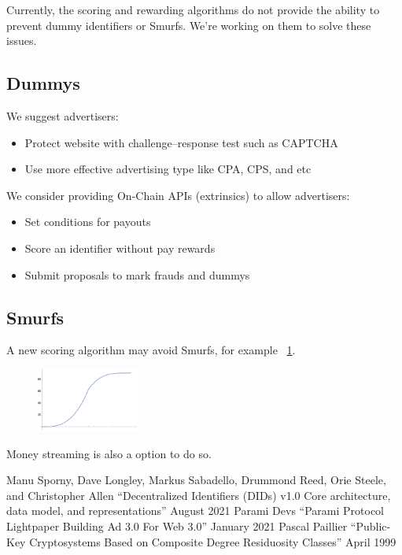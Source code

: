 \documentclass[twoside,twocolumn]{article}
\begin{document}
Currently, the scoring and rewarding algorithms do not provide the ability to prevent dummy identifiers or Smurfs.
We're working on them to solve these issues.

\subsection{Dummys}

We suggest advertisers:
\begin{itemize}
    \item Protect website with challenge–response test such as CAPTCHA
    \item Use more effective advertising type like CPA, CPS, and etc
\end{itemize}

We consider providing On-Chain APIs (extrinsics) to allow advertisers:
\begin{itemize}
    \item Set conditions for payouts
    \item Score an identifier without pay rewards
    \item Submit proposals to mark frauds and dummys
\end{itemize}

\subsection{Smurfs}

A new scoring algorithm may avoid Smurfs, for example ~\ref{fig:score_d}.

\begin{figure}
    \centering
    \includegraphics[width=0.3\textwidth]{score_d}
    \label{fig:score_d}
\end{figure}

Money streaming is also a option to do so.


\begin{thebibliography}{99} %

     Manu Sporny, Dave Longley, Markus Sabadello, Drummond Reed,
    Orie Steele, and Christopher Allen
    ``Decentralized Identifiers (DIDs) v1.0 Core architecture, data model, and representations''
    August 2021
     Parami Devs
    ``Parami Protocol Lightpaper Building Ad 3.0 For Web 3.0''
    January 2021
     Pascal Paillier
    ``Public-Key Cryptosystems Based on Composite Degree Residuosity Classes''
    April 1999

\end{thebibliography}

\end{document}
